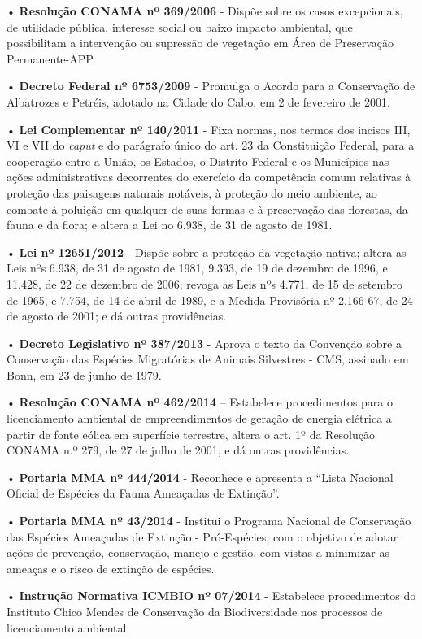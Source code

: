 \documentclass[
  oneside]{scrbook}
\begin{document}
• \textbf{Resolução CONAMA nº 369/2006} - Dispõe sobre os casos excepcionais, de utilidade pública, interesse social ou baixo impacto ambiental, que possibilitam a intervenção ou supressão de vegetação em Área de Preservação Permanente-APP.

• \textbf{Decreto Federal nº 6753/2009} - Promulga o Acordo para a Conservação de Albatrozes e Petréis, adotado na Cidade do Cabo, em 2 de fevereiro de 2001.

• \textbf{Lei Complementar nº 140/2011} - Fixa normas, nos termos dos incisos III, VI e VII do \emph{caput} e do parágrafo único do art. 23 da Constituição Federal, para a cooperação entre a União, os Estados, o Distrito Federal e os Municípios nas ações administrativas decorrentes do exercício da competência comum relativas à proteção das paisagens naturais notáveis, à proteção do meio ambiente, ao combate à poluição em qualquer de suas formas e à preservação das florestas, da fauna e da flora; e altera a Lei no 6.938, de 31 de agosto de 1981.

• \textbf{Lei nº 12651/2012} - Dispõe sobre a proteção da vegetação nativa; altera as Leis nºs 6.938, de 31 de agosto de 1981, 9.393, de 19 de dezembro de 1996, e 11.428, de 22 de dezembro de 2006; revoga as Leis nºs 4.771, de 15 de setembro de 1965, e 7.754, de 14 de abril de 1989, e a Medida Provisória nº 2.166-67, de 24 de agosto de 2001; e dá outras providências.

• \textbf{Decreto Legislativo nº 387/2013} - Aprova o texto da Convenção sobre a Conservação das Espécies Migratórias de Animais Silvestres - CMS, assinado em Bonn, em 23 de junho de 1979.

• \textbf{Resolução CONAMA nº 462/2014} -- Estabelece procedimentos para o licenciamento ambiental de empreendimentos de geração de energia elétrica a partir de fonte eólica em superfície terrestre, altera o art. 1º da Resolução CONAMA n.º 279, de 27 de julho de 2001, e dá outras providências.

• \textbf{Portaria MMA nº 444/2014} - Reconhece e apresenta a ``Lista Nacional Oficial de Espécies da Fauna Ameaçadas de Extinção''.

• \textbf{Portaria MMA nº 43/2014} - Institui o Programa Nacional de Conservação das Espécies Ameaçadas de Extinção - Pró-Espécies, com o objetivo de adotar ações de prevenção, conservação, manejo e gestão, com vistas a minimizar as ameaças e o risco de extinção de espécies.

• \textbf{Instrução Normativa ICMBIO nº 07/2014} - Estabelece procedimentos do Instituto Chico Mendes de Conservação da Biodiversidade nos processos de licenciamento ambiental.
\end{document}
